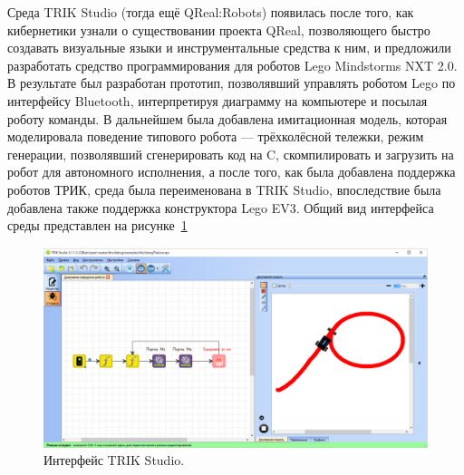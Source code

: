 \documentclass[conference]{IEEEtran}
\begin{document}
Среда TRIK Studio (тогда ещё QReal:Robots) появилась после того, как кибернетики узнали 
о существовании проекта QReal, позволяющего быстро создавать визуальные языки и инструментальные 
средства к ним, и предложили разработать средство программирования для роботов Lego Mindstorms NXT 2.0. 
В результате был разработан прототип, позволявший управлять роботом Lego по интерфейсу 
Bluetooth, интерпретируя диаграмму на компьютере и посылая роботу команды. В дальнейшем 
была добавлена имитационная модель, которая моделировала поведение типового робота --- 
трёхколёсной тележки, режим генерации, позволявший сгенерировать код на C, скомпилировать 
и загрузить на робот для автономного исполнения, а после того, как была добавлена 
поддержка роботов ТРИК, среда была переименована в TRIK Studio, впоследствие была добавлена 
также поддержка конструктора Lego EV3. Общий вид интерфейса среды представлен на рисунке~\ref{image:trikStudio}

\begin{figure}[!t]
	\centering
	\includegraphics[width=7in]{trikStudio.png}
	\caption{Интерфейс TRIK Studio.}
	\label{image:trikStudio}
\end{figure}
\end{document}
